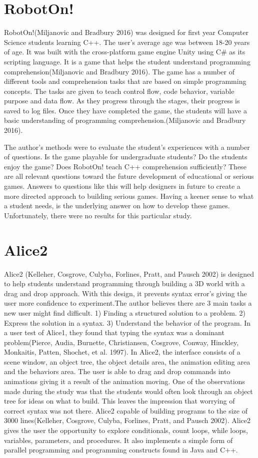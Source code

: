 \section{RobotOn!}
RobotOn!(Miljanovic and Bradbury 2016) was designed for first year Computer Science students learning C++. The user's average age was between 18-20 years of age. It was built with the cross-platform game engine Unity using C\# as its scripting language. It is a game that helps the student understand programming comprehension(Miljanovic and Bradbury 2016). The game has a number of different tools and comprehension tasks that are based on simple programming concepts. The tasks are given to teach control flow, code behavior, variable purpose and data flow. As they progress through the stages, their progress is saved to log files. Once they have completed the game, the students will have a basic understanding of programming comprehension.(Miljanovic and Bradbury 2016).

The author's methods were to evaluate the student's experiences with a number of questions. Is the game playable for undergraduate students? Do the students enjoy the game? Does RobotOn! teach C++ comprehension sufficiently? These are all relevant questions toward the future development of educational or serious games. Answers to questions like this will help designers in future to create a more directed approach to building serious games. Having a keener sense to what a student needs, is the underlying answer on how to develop these games. Unfortunately, there were no results for this particular study.

\section{Alice2}
Alice2 (Kelleher, Cosgrove, Culyba, Forlines, Pratt, and Pausch 2002) is designed to help students understand programming through building a 3D world with a drag and drop approach. With this design, it prevents syntax error's giving the user more confidence to experiment.The author believes there are 3 main tasks a new user might find difficult. 1) Finding a structured solution to a problem. 2) Express the solution in a syntax. 3) Understand the behavior of the program. In a user test of Alice1, they found that typing the syntax was a dominant problem(Pierce, Audia, Burnette, Christiansen, Cosgrove, Conway, Hinckley, Monkaitis, Patten, Shochet, et al. 1997).
In Alice2, the interface consists of a scene window, an object tree, the object details area, the animation editing area and the behaviors area. The user is able to drag and drop commands into animations giving it a result of the animation moving. One of the observations made during the study was that the students would often look through an object tree for ideas on what to build. This leaves the impression that worrying of correct syntax was not there. Alice2 capable of building programs to the size of 3000 lines(Kelleher, Cosgrove, Culyba, Forlines, Pratt, and Pausch 2002). Alice2 gives the user the opportunity to explore conditionals, count loops, while loops, variables, parameters, and procedures. It also implements a simple form of parallel programming and programming constructs found in Java and C++.

